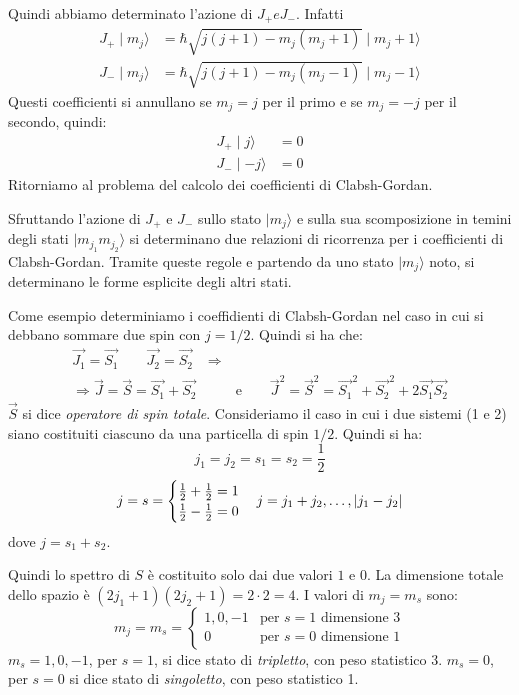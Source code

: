 Quindi abbiamo determinato l'azione di $J_{+} e J_{-}$. Infatti
\begin{align}
J_{+} \mid m_{j} \rangle &= \hbar \sqrt{j\left(j+1\right) - m_{j}\left(m_{j} +1\right)} \mid m_{j} +1 \rangle \\
J_{-} \mid m_{j}\rangle &= \hbar \sqrt{j\left(j+1\right) - m_{j}\left(m_{j} -1\right)} \mid m_{j} -1 \rangle
\end{align}
Questi coefficienti si annullano se $m_{j} = j$ per il primo e se $m_{j} =-j$
per il secondo, quindi:
\begin{align}
J_{+}\mid j\rangle &= 0 \\
J_{-}\mid -j\rangle &= 0
\end{align}
Ritorniamo al problema del calcolo dei coefficienti di Clabsh-Gordan.

Sfruttando l'azione di $J_{+}$ e $J_{-}$ sullo stato $\mid m_{j}\rangle$ e sulla
sua scomposizione in temini degli stati $\mid m_{j_{1}} m_{j_{2}} \rangle$ si
determinano due relazioni di ricorrenza per i coefficienti di Clabsh-Gordan.
Tramite queste regole e partendo da uno stato $\mid m_{j} \rangle$ noto, si
determinano le forme esplicite degli altri stati.

Come esempio determiniamo i coeffidienti di Clabsh-Gordan nel caso in cui si
debbano sommare due spin con $j=1/2$. Quindi si ha che:
\begin{equation}
\begin{split}
\vec{J_{1}} =\vec{S_{1}} \quad \quad \vec{J_{2}} =\vec{S_{2}} & \Rightarrow \\
\Rightarrow \vec{J} = \vec{S} = \vec{S_{1}} + \vec{S_{2}} & \quad \quad \text{e} \quad \quad \vec{J}^{2} = \vec{S}^{2} = \vec{S_{1}}^{2} + \vec{S_{2}}^{2} + 2\vec{S_{1}}\vec{S_{2}}
\end{split}
\end{equation}
$\vec{S}$ si dice \textit{operatore di spin totale}. Consideriamo il caso in cui
i due sistemi (1 e 2) siano costituiti ciascuno da una particella di spin $1/2$.
Quindi si ha:
\begin{equation}
j_{1} = j_{2} = s_{1} = s_{2} = \dfrac{1}{2}
\end{equation}
\[
j = s =
\begin{cases}
\frac{1}{2} + \frac{1}{2} = 1 \\
\frac{1}{2} - \frac{1}{2} = 0
\end{cases}
j = j_{1} + j_{2}, \dots, \left| j_{1} - j_{2} \right|
\]
dove $j = s_{1} + s_{2}$.

Quindi lo spettro di $S$ è costituito solo dai due valori $1$ e $0$. La
dimensione totale dello spazio è $\left(2j_{1} +1\right)\left(2j_{2} +1 \right)
= 2 \cdot 2 = 4$. I valori di $m_{j} = m_{s}$ sono:
\[
m_{j} = m_{s} = 
\begin{cases}
1, 0, -1 & \text{per $s=1$ \ dimensione 3} \\
0 & \text{per $s=0$ \ dimensione 1}
\end{cases}
\]
$m_{s}= 1,0,-1$, per $s=1$, si dice stato di \textit{tripletto}, con peso
statistico 3. $m_{s} = 0$, per $s=0$ si dice stato di \textit{singoletto}, con
peso statistico 1.

